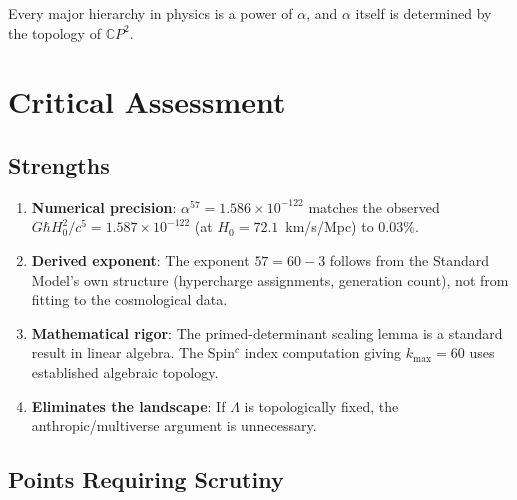 \documentclass[11pt]{article}
\begin{document}
Every major hierarchy in physics is a power of $\alpha$, and $\alpha$ itself is
determined by the topology of $\mathbb{C}P^2$.

\section{Critical Assessment}

\subsection{Strengths}

\begin{enumerate}
\item \textbf{Numerical precision}: $\alpha^{57} = 1.586 \times 10^{-122}$ matches the
observed $G\hbar H_0^2/c^5 = 1.587 \times 10^{-122}$ (at $H_0 = 72.1$~km/s/Mpc)
to 0.03\%.

\item \textbf{Derived exponent}: The exponent $57 = 60 - 3$ follows from the Standard
Model's own structure (hypercharge assignments, generation count), not from fitting
to the cosmological data.

\item \textbf{Mathematical rigor}: The primed-determinant scaling lemma is a standard
result in linear algebra. The Spin$^c$ index computation giving $k_{\max} = 60$ uses
established algebraic topology.

\item \textbf{Eliminates the landscape}: If $\Lambda$ is topologically fixed, the
anthropic/multiverse argument is unnecessary.
\end{enumerate}

\subsection{Points Requiring Scrutiny}
\end{document}

